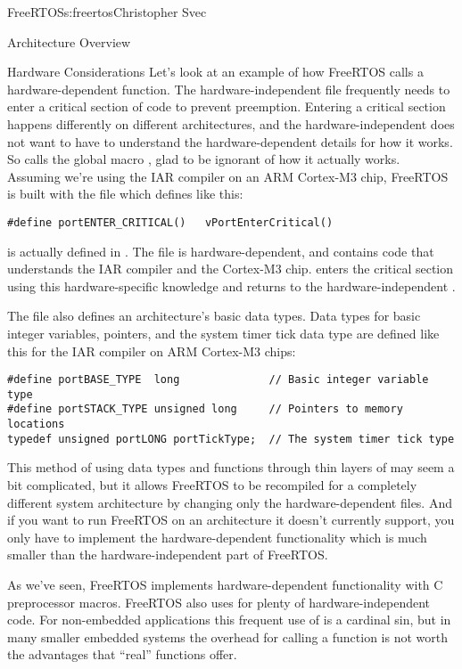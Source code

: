 \begin{aosachapter}{FreeRTOS}{s:freertos}{Christopher Svec}
\begin{aosasect1}{Architecture Overview}
\begin{aosasect2}{Hardware Considerations}
Let's look at an example of how FreeRTOS calls a hardware-dependent
function. The hardware-independent file  frequently
needs to enter a critical section of code to prevent
preemption. Entering a critical section happens differently on
different architectures, and the hardware-independent 
does not want to have to understand the hardware-dependent details for
how it works. So  calls the global macro
, glad to be ignorant of how it actually
works.  Assuming we're using the IAR compiler on an ARM Cortex-M3
chip, FreeRTOS is built with the file
 which defines
 like this:

\begin{verbatim}
#define portENTER_CRITICAL()   vPortEnterCritical()
\end{verbatim}

\noindent {} is actually defined in
. The 
file is hardware-dependent, and contains code that understands the IAR
compiler and the Cortex-M3 chip.  enters
the critical section using this hardware-specific knowledge and
returns to the hardware-independent .

The  file also defines an architecture's basic data
types.  Data types for basic integer variables, pointers, and the
system timer tick data type are defined like this for the IAR compiler
on ARM Cortex-M3 chips:

\begin{verbatim}
#define portBASE_TYPE  long              // Basic integer variable type
#define portSTACK_TYPE unsigned long     // Pointers to memory locations
typedef unsigned portLONG portTickType;  // The system timer tick type
\end{verbatim}

This method of using data types and functions through thin layers of
 may seem a bit complicated, but it allows FreeRTOS to
be recompiled for a completely different system architecture by
changing only the hardware-dependent files. And if you want to run
FreeRTOS on an architecture it doesn't currently support, you only have
to implement the hardware-dependent functionality which is much
smaller than the hardware-independent part of FreeRTOS.

As we've seen, FreeRTOS implements hardware-dependent functionality
with C preprocessor  macros. FreeRTOS also uses
 for plenty of hardware-independent code. For
non-embedded applications this frequent use of  is a
cardinal sin, but in many smaller embedded systems the overhead for
calling a function is not worth the advantages that ``real'' functions
offer.


\end{aosasect2}
\end{aosasect1}
\end{aosachapter}
